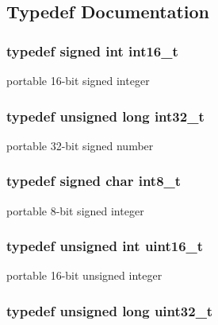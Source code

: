\subsection{Typedef Documentation}
\hypertarget{group__ez_l_c_d__103__common_ga932e6ccc3d54c58f761c1aead83bd6d7}{
\subsubsection[{int16\-\_\-t}]{\setlength{\rightskip}{0pt plus 5cm}typedef signed int {\bf int16\-\_\-t}}}\label{group__ez_l_c_d__103__common_ga932e6ccc3d54c58f761c1aead83bd6d7}
portable 16-\/bit signed integer \hypertarget{group__ez_l_c_d__103__common_gad362a62f5bae89670bdcd2f18a0a73a8}{
\subsubsection[{int32\-\_\-t}]{\setlength{\rightskip}{0pt plus 5cm}typedef unsigned long {\bf int32\-\_\-t}}}\label{group__ez_l_c_d__103__common_gad362a62f5bae89670bdcd2f18a0a73a8}
portable 32-\/bit signed number \hypertarget{group__ez_l_c_d__103__common_gaef44329758059c91c76d334e8fc09700}{
\subsubsection[{int8\-\_\-t}]{\setlength{\rightskip}{0pt plus 5cm}typedef signed char {\bf int8\-\_\-t}}}\label{group__ez_l_c_d__103__common_gaef44329758059c91c76d334e8fc09700}
portable 8-\/bit signed integer \hypertarget{group__ez_l_c_d__103__common_ga1f1825b69244eb3ad2c7165ddc99c956}{
\subsubsection[{uint16\-\_\-t}]{\setlength{\rightskip}{0pt plus 5cm}typedef unsigned int {\bf uint16\-\_\-t}}}\label{group__ez_l_c_d__103__common_ga1f1825b69244eb3ad2c7165ddc99c956}
portable 16-\/bit unsigned integer \hypertarget{group__ez_l_c_d__103__common_ga06896e8c53f721507066c079052171f8}{
\subsubsection[{uint32\-\_\-t}]{\setlength{\rightskip}{0pt plus 5cm}typedef unsigned long {\bf uint32\-\_\-t}}}\label{group__ez_l_c_d__103__common_ga06896e8c53f721507066c079052171f8}
